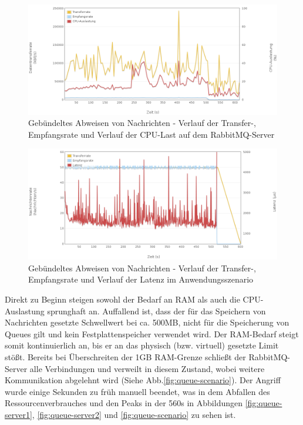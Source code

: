 \documentclass[	a4paper,
			11pt,
			oneside,
			parskip]{scrartcl}
\begin{document}
		\begin{figure}[!htb]
			\centering
			\includegraphics[width=\textwidth]{img/nack/nack_server2.png}
			\caption{Gebündeltes Abweisen von Nachrichten - Verlauf der Transfer-, Empfangsrate und Verlauf der CPU-Last auf dem RabbitMQ-Server}
			\label{fig:nack-server2}
		\end{figure}
		
		\begin{figure}[!htb]
			\centering
			\includegraphics[width=\textwidth]{img/nack/nack_scenario.png}
			\caption{Gebündeltes Abweisen von Nachrichten - Verlauf der Transfer-, Empfangsrate und Verlauf der Latenz im Anwendungsszenario}
			\label{fig:nack-scenario}
		\end{figure}
	
	
	\clearpage
		{%
		  \newline
		  \newline
		  \newline
		}{%
		 Direkt zu Beginn steigen sowohl der Bedarf an RAM als auch die CPU-Auslastung sprunghaft an. Auffallend ist, dass der für das Speichern von Nachrichten gesetzte Schwellwert bei ca. 500MB,
		 nicht für die Speicherung von Queues gilt und kein Festplattenspeicher verwendet wird. Der RAM-Bedarf steigt somit kontinuierlich an, bis er an das physisch (bzw. virtuell) gesetzte Limit stößt. Bereits bei Überschreiten der 1GB RAM-Grenze
		 schließt der RabbitMQ-Server alle Verbindungen und verweilt in diesem Zustand, wobei weitere Kommunikation abgelehnt wird (Siehe Abb.\ref{fig:queue-scenario}).
		}{%
		 Der Angriff wurde einige Sekunden zu früh manuell beendet, was in dem Abfallen des Ressourcenverbrauches und den Peaks in der 560s in Abbildungen \ref{fig:queue-server1}, \ref{fig:queue-server2}
		 und \ref{fig:queue-scenario} zu sehen ist.
		}
		
\end{document}
